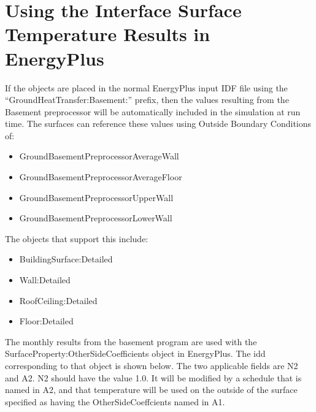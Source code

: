 \section{Using the Interface Surface Temperature Results in EnergyPlus}\label{using-the-interface-surface-temperature-results-in-energyplus}

If the objects are placed in the normal EnergyPlus input IDF file using the ``GroundHeatTransfer:Basement:'' prefix, then the values resulting from the Basement preprocessor will be automatically included in the simulation at run time. The surfaces can reference these values using Outside Boundary Conditions of:

\begin{itemize}
\item
  GroundBasementPreprocessorAverageWall
\item
  GroundBasementPreprocessorAverageFloor
\item
  GroundBasementPreprocessorUpperWall
\item
  GroundBasementPreprocessorLowerWall
\end{itemize}

The objects that support this include:

\begin{itemize}
\item
  BuildingSurface:Detailed
\item
  Wall:Detailed
\item
  RoofCeiling:Detailed
\item
  Floor:Detailed
\end{itemize}

The monthly results from the basement program are used with the SurfaceProperty:OtherSideCoefficients object in EnergyPlus. The idd corresponding to that object is shown below. The two applicable fields are N2 and A2. N2 should have the value 1.0. It will be modified by a schedule that is named in A2, and that temperature will be used on the outside of the surface specified as having the OtherSideCoeffcients named in A1.

